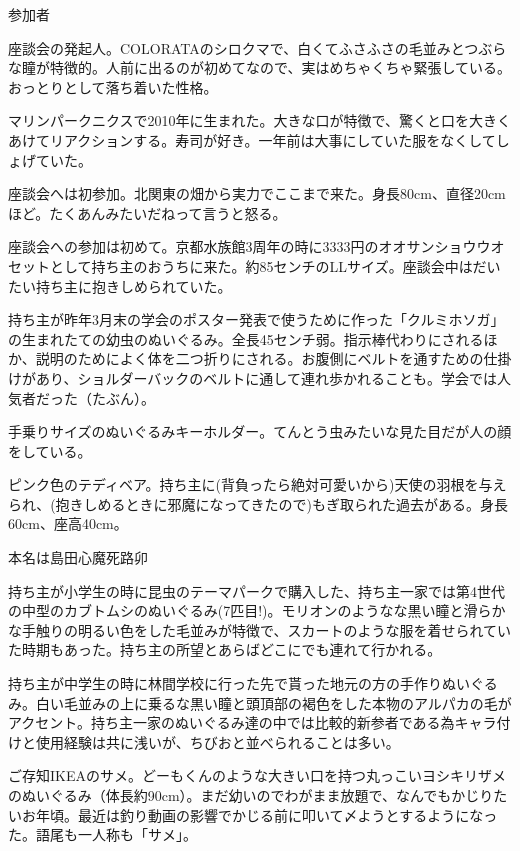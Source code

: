 \documentclass[9pt,4aj]{jsarticle}
\begin{document}
\begin{itembox}[m]{\LARGE 参加者}
{\small
{}
座談会の発起人。COLORATAのシロクマで、白くてふさふさの毛並みとつぶらな瞳が特徴的。人前に出るのが初めてなので、実はめちゃくちゃ緊張している。おっとりとして落ち着いた性格。

マリンパークニクスで2010年に生まれた。大きな口が特徴で、驚くと口を大きくあけてリアクションする。寿司が好き。一年前は大事にしていた服をなくしてしょげていた。

座談会へは初参加。北関東の畑から実力でここまで来た。身長80cm、直径20cmほど。たくあんみたいだねって言うと怒る。


座談会への参加は初めて。京都水族館3周年の時に3333円のオオサンショウウオセットとして持ち主のおうちに来た。約85センチのLLサイズ。座談会中はだいたい持ち主に抱きしめられていた。

持ち主が昨年3月末の学会のポスター発表で使うために作った「クルミホソガ」の生まれたての幼虫のぬいぐるみ。全長45センチ弱。指示棒代わりにされるほか、説明のためによく体を二つ折りにされる。お腹側にベルトを通すための仕掛けがあり、ショルダーバックのベルトに通して連れ歩かれることも。学会では人気者だった（たぶん）。

手乗りサイズのぬいぐるみキーホルダー。てんとう虫みたいな見た目だが人の顔をしている。

ピンク色のテディベア。持ち主に(背負ったら絶対可愛いから)天使の羽根を与えられ、(抱きしめるときに邪魔になってきたので)もぎ取られた過去がある。身長60cm、座高40cm。

本名は島田心魔死路卯

持ち主が小学生の時に昆虫のテーマパークで購入した、持ち主一家では第4世代の中型のカブトムシのぬいぐるみ(7匹目!)。モリオンのようなな黒い瞳と滑らかな手触りの明るい色をした毛並みが特徴で、スカートのような服を着せられていた時期もあった。持ち主の所望とあらばどこにでも連れて行かれる。

持ち主が中学生の時に林間学校に行った先で貰った地元の方の手作りぬいぐるみ。白い毛並みの上に乗るな黒い瞳と頭頂部の褐色をした本物のアルパカの毛がアクセント。持ち主一家のぬいぐるみ達の中では比較的新参者である為キャラ付けと使用経験は共に浅いが、ちびおと並べられることは多い。

ご存知IKEAのサメ。どーもくんのような大きい口を持つ丸っこいヨシキリザメのぬいぐるみ（体長約90cm）。まだ幼いのでわがまま放題で、なんでもかじりたいお年頃。最近は釣り動画の影響でかじる前に叩いて〆ようとするようになった。語尾も一人称も「サメ」。

}
\end{itembox}
\end{document}
